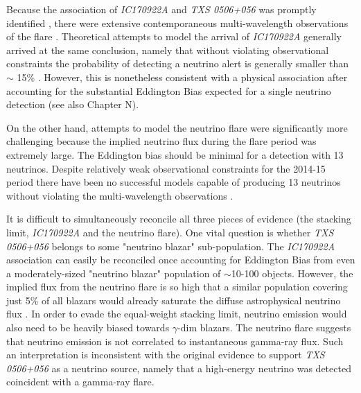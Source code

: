 Because the association of \emph{IC170922A} and \emph{TXS 0506+056} was promptly identified , there were extensive contemporaneous multi-wavelength observations of the flare \cite{2018Sci...361.1378I}. Theoretical attempts to model the arrival of \emph{IC170922A} generally arrived at the same conclusion, namely that without violating observational constraints the probability of detecting a neutrino alert is generally smaller than $\sim$ 15\% . However, this is nonetheless consistent with a physical association after accounting for the substantial Eddington Bias expected for a single neutrino detection  (see also Chapter N).

On the other hand, attempts to model the neutrino flare were significantly more challenging because the implied neutrino flux during the flare period was extremely large. The Eddington bias should be minimal for a detection with 13 neutrinos. Despite relatively weak observational constraints for the 2014-15 period there have been no successful models capable of producing 13 neutrinos without violating the multi-wavelength observations .

It is difficult to simultaneously reconcile all three pieces of evidence (the stacking limit, \emph{IC170922A} and the neutrino flare). One vital question is whether \emph{TXS 0506+056} belongs to some "neutrino blazar" sub-population. The \emph{IC170922A} association can easily be reconciled once accounting for Eddington Bias from even a moderately-sized "neutrino blazar" population of $\sim$10-100 objects. However, the implied flux from the neutrino flare is so high that a similar population covering just 5\% of all blazars would already saturate the diffuse astrophysical neutrino flux . In order to evade the equal-weight stacking limit, neutrino emission would also need to be heavily biased towards $\gamma$-dim blazars. The neutrino flare suggests that neutrino emission is not correlated to instantaneous gamma-ray flux. Such an interpretation is inconsistent with the original evidence to support \emph{TXS 0506+056} as a neutrino source, namely that a high-energy neutrino was detected coincident with a gamma-ray flare.

